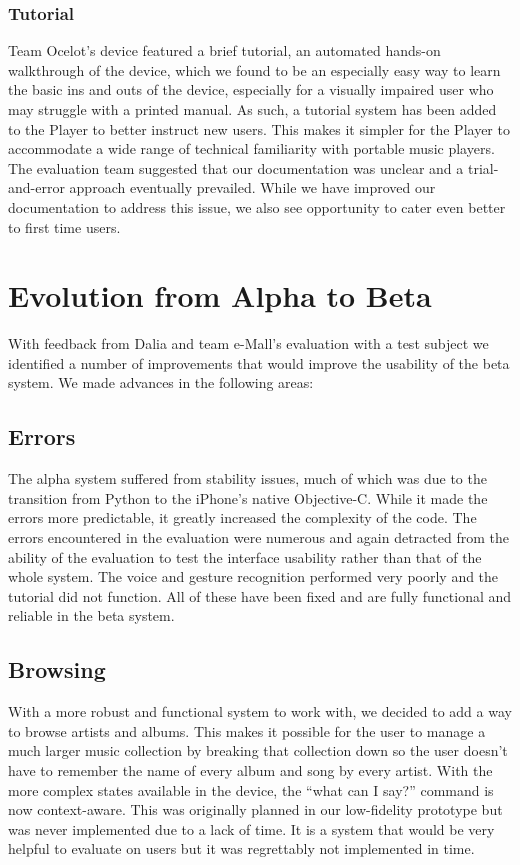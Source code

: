 \documentclass[10pt,letterpaper]{article}
\begin{document}
\subsubsection*{Tutorial}
Team Ocelot's device featured a brief tutorial, an automated hands-on walkthrough of the device, which we found to be an especially easy way to learn the basic ins and outs of the device, especially for a visually impaired user who may struggle with a printed manual. As such, a tutorial system has been added to the Player to better instruct new users. This makes it simpler for the Player to accommodate a wide range of technical familiarity with portable music players. The evaluation team suggested that our documentation was unclear and a trial-and-error approach eventually prevailed. While we have improved our documentation to address this issue, we also see opportunity to cater even better to first time users.

\section*{Evolution from Alpha to Beta}
With feedback from Dalia and team e-Mall's evaluation with a test subject we identified a number of improvements that would improve the usability of the beta system. We made advances in the following areas:
\subsection*{Errors}
The alpha system suffered from stability issues, much of which was due to the transition from Python to the iPhone's native Objective-C. While it made the errors more predictable, it greatly increased the complexity of the code. The errors encountered in the evaluation were numerous and again detracted from the ability of the evaluation to test the interface usability rather than that of the whole system. The voice and gesture recognition performed very poorly and the tutorial did not function. All of these have been fixed and are fully functional and reliable in the beta system.

\subsection*{Browsing}
With a more robust and functional system to work with, we decided to add a way to browse artists and albums. This makes it possible for the user to manage a much larger music collection by breaking that collection down so the user doesn't have to remember the name of every album and song by every artist. With the more complex states available in the device, the ``what can I say?'' command is now context-aware. This was originally planned in our low-fidelity prototype but was never implemented due to a lack of time. It is a system that would be very helpful to evaluate on users but it was regrettably not implemented in time.
\end{document}
